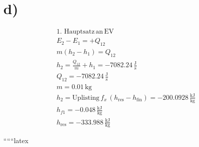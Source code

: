 

\section*{d)}

\begin{align*}
\text{1. Hauptsatz} \, \text{an} \, \text{EV} \\
E_2 - E_1 = + Q_{12} \\
m(h_2 - h_1) = Q_{12} \\
h_2 = \frac{Q_{12}}{m} + h_1 = -7082.24 \, \frac{\text{J}}{\text{s}} \\
Q_{12} = -7082.24 \, \frac{\text{J}}{\text{s}} \\
m = 0.01 \, \text{kg} \\
h_2 = \text{Uplisting} \, f_x \, (h_{\text{res}} - h_{\text{fin}}) = -200.0928 \, \frac{\text{kJ}}{\text{kg}} \\
h_{f1} = -0.048 \, \frac{\text{kJ}}{\text{kg}} \\
h_{\text{res}} = -333.988 \, \frac{\text{kJ}}{\text{kg}}
\end{align*}

``````latex